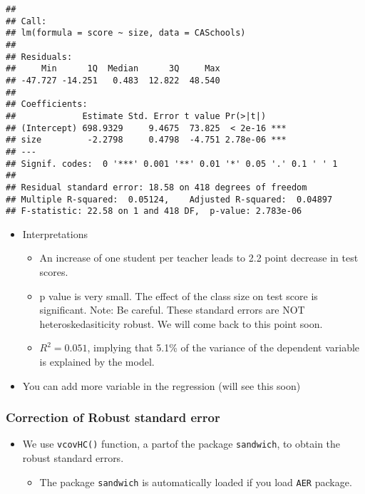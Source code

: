 \documentclass[]{book}
\providecommand{\tightlist}{%
  \setlength{\itemsep}{0pt}\setlength{\parskip}{0pt}}
\begin{document}
\begin{verbatim}
## 
## Call:
## lm(formula = score ~ size, data = CASchools)
## 
## Residuals:
##     Min      1Q  Median      3Q     Max 
## -47.727 -14.251   0.483  12.822  48.540 
## 
## Coefficients:
##             Estimate Std. Error t value Pr(>|t|)    
## (Intercept) 698.9329     9.4675  73.825  < 2e-16 ***
## size         -2.2798     0.4798  -4.751 2.78e-06 ***
## ---
## Signif. codes:  0 '***' 0.001 '**' 0.01 '*' 0.05 '.' 0.1 ' ' 1
## 
## Residual standard error: 18.58 on 418 degrees of freedom
## Multiple R-squared:  0.05124,    Adjusted R-squared:  0.04897 
## F-statistic: 22.58 on 1 and 418 DF,  p-value: 2.783e-06
\end{verbatim}

\begin{itemize}
\tightlist
\item
  Interpretations

  \begin{itemize}
  \tightlist
  \item
    An increase of one student per teacher leads to 2.2 point decrease in test scores.
  \item
    p value is very small. The effect of the class size on test score is significant.
    Note: Be careful. These standard errors are NOT heteroskedasiticity robust. We will come back to this point soon.
  \item
    \(R^2 = 0.051\), implying that 5.1\% of the variance of the dependent variable is explained by the model.
  \end{itemize}
\item
  You can add more variable in the regression (will see this soon)
\end{itemize}

\hypertarget{correction-of-robust-standard-error}{%
\subsubsection{Correction of Robust standard error}\label{correction-of-robust-standard-error}}

\begin{itemize}
\tightlist
\item
  We use \texttt{vcovHC()} function, a partof the package \texttt{sandwich}, to obtain the robust standard errors.

  \begin{itemize}
  \tightlist
  \item
    The package \texttt{sandwich} is automatically loaded if you load \texttt{AER} package.
  \end{itemize}
\end{itemize}
\end{document}
